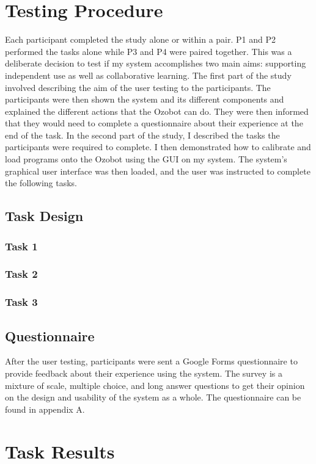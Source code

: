 \documentclass[oneside,%
                    author={Malak Hajji},
                    degree={BSc},
                    title={Designing An Accessible Computational Toolkit For Students},
                  subtitle={With Mixed Visual Abilities}]{dissertation}
\begin{document}
\section{Testing Procedure}

Each participant completed the study alone or within a pair. P1 and P2 performed the tasks alone while P3 and P4 were paired together. This was a deliberate decision to test if my system accomplishes two main aims: supporting independent use as well as collaborative learning. 
The first part of the study involved describing the aim of the user testing to the participants. The participants were then shown the system and its different components and explained the different actions that the Ozobot can do. They were then informed that they would need to complete a questionnaire about their experience at the end of the task. 
In the second part of the study, I described the tasks the participants were required to complete. I then demonstrated how to calibrate and load programs onto the Ozobot using the GUI on my system. The system's graphical user interface was then loaded, and the user was instructed to complete the following tasks.
\subsection{Task Design}
\subsubsection{Task 1}

\subsubsection{Task 2}
\subsubsection{Task 3}

\subsection{Questionnaire}
After the user testing, participants were sent a Google Forms questionnaire to provide feedback about their experience using the system. The survey is a mixture of scale, multiple choice, and long answer questions to get their opinion on the design and usability of the system as a whole. The questionnaire can be found in appendix A.

\section{Task Results}
\end{document}
